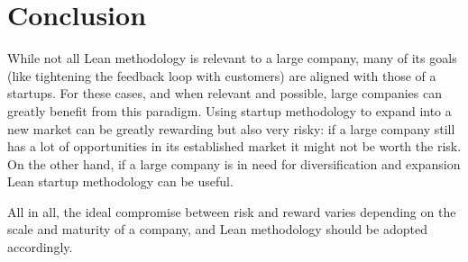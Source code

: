 \documentclass[conference]{IEEEtran}
\begin{document}
    \section{Conclusion}
    \label{section:conclusion}

    While not all Lean methodology is relevant to a large company, many of its goals (like tightening the
    feedback loop with customers) are aligned with those of a startups. For these cases, and when relevant
    and possible, large companies can greatly benefit from this paradigm.
    Using startup methodology to expand into a new market can be greatly rewarding but also very risky: if a large company still has a lot of opportunities in its established market it might not be worth the risk.
    On the other hand, if a large company is in need for diversification and expansion Lean startup methodology can be useful.

    All in all, the ideal compromise between risk and reward varies depending
    on the scale and maturity of a company, and Lean methodology should be adopted accordingly.

    
    
\end{document}
